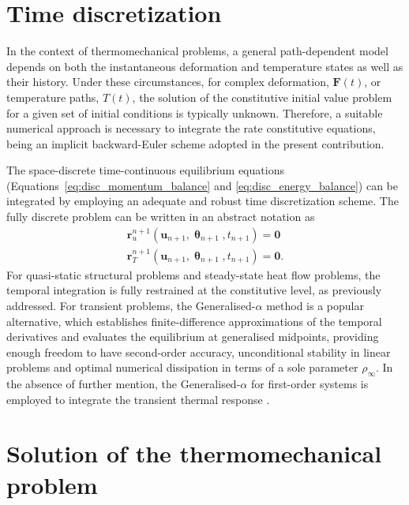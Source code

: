 \section{Time discretization}

In the context of thermomechanical problems, a general path-dependent model depends on both the instantaneous deformation and temperature states as well as their history.
Under these circumstances, for complex deformation, $\bm{F}(t)$, or temperature paths, $T(t)$, the solution of the constitutive initial value problem for a given set of initial conditions is typically unknown.
Therefore, a suitable numerical approach is necessary to integrate the rate constitutive equations, being an implicit backward-Euler scheme adopted in the present contribution.

The space-discrete time-continuous equilibrium equations (Equations~\eqref{eq:disc_momentum_balance} and \eqref{eq:disc_energy_balance}) can be integrated by employing an adequate and robust time discretization scheme.
The fully discrete problem can be written in an abstract notation as 
\begin{gather}
  \mathbf{r}_{u}^{n+1}(\mathbf{u}_{n+1}, \bm{\uptheta}_{n+1}, t_{n+1})=\bm{0}\,\label{eq:mech_problem}\\
  \mathbf{r}_{T}^{n+1}(\mathbf{u}_{n+1}, \bm{\uptheta}_{n+1}, t_{n+1}) = \bm{0}. \label{eq:therm_problem}
\end{gather}
For quasi-static structural problems and steady-state heat flow problems, the temporal integration is fully restrained at the constitutive level, as previously addressed.
For transient problems, the Generalised-$\alpha$ method is a popular alternative, which establishes finite-difference approximations of the temporal derivatives and evaluates the equilibrium at generalised midpoints, providing enough freedom to have second-order accuracy, unconditional stability in linear problems and optimal numerical dissipation in terms of a sole parameter $\rho_{\infty}$.
In the absence of further mention, the Generalised-$\alpha$ for first-order systems is employed to integrate the transient thermal response \citep{jansen2000GeneralizedaMethodIntegrating}.

\section{Solution of the thermomechanical problem}


